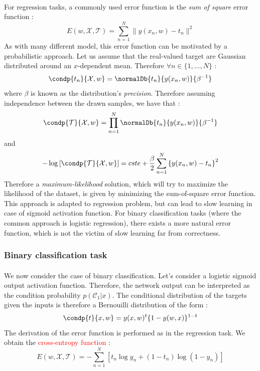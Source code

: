 \documentclass[a4paper]{article}
\begin{document}
{{{				\paragraph{} For regression tasks, a commonly used error function is the \emph{sum of square} error function : 
				\begin{equation}
					E(w,\mathcal{X},\mathcal{T}) = \sum_{n=1}^N \lVert y(x_n,w) - t_n\rVert ^2 
				\end{equation}
				As with many different model, this error function can be motivated by a probabilistic approach. Let us assume that the real-valued target are Gaussian distributed around an $x$-dependent mean. Therefore $\forall{n}\in\{1,\hdots, N \}$ : 
				\begin{equation}
					\condp{t_n}{\mathcal{X},w} = \normalDb{t_n}{y(x_n,w)}{\beta^{-1}}
				\end{equation}
				where $\beta$ is known as the distribution's \emph{precision}. Therefore assuming independence between the drawn samples, we have that : 
				\begin{equation}
					\condp{\mathcal{T}}{\mathcal{X},w} = \prod_{n=1}^N  \normalDb{t_n}{y(x_n,w)}{\beta^{-1}}
				\end{equation}
				and 
				\begin{equation}
					-\log{\left[ \condp{\mathcal{T}}{\mathcal{X},w} \right]} = cste + \frac{\beta}{2} \sum_{n=1}^N \left\{ y(x_n,w) - t_n\right\}^2
				\end{equation}
				Therefore a \emph{maximum-likelihood} solution, which will try to maximize the likelihood of the dataset, is given by minimizing the sum-of-square error function. This approach is adapted to regression problem, but can lead to slow learning in case of sigmoid activation function. For binary classification tasks (where the common approach is logistic regression), there exists a more natural error function, which is not the victim of slow learning far from correctness. 
			}
			\subsubsection{Binary classification task}
			{
				\paragraph{} We now consider the case of binary classification. Let's consider a logistic sigmoid output activation function. Therefore, the network output can be interpreted as the condition probability $p\left(\mathcal{C}_1\vert  x\right)$. The conditional distribution of the targets given the inputs is therefore a Bernouilli distribution of the form : 
				\begin{equation}
					\condp{t}{x,w} = y(x,w)^t \{1-y(w,x)\}^{1-t}
				\end{equation}
				The derivation of the error function is performed as in the regression task. We obtain the \textcolor{red}{cross-entropy function} : 
				\begin{equation}
					E(w,\mathcal{X},\mathcal{T}) = -\sum_{n=1}^N \left[ t_n\log{y_n} + (1-t_n)\log{(1-y_n)}\right]
				\end{equation}
				
}}}
\end{document}
